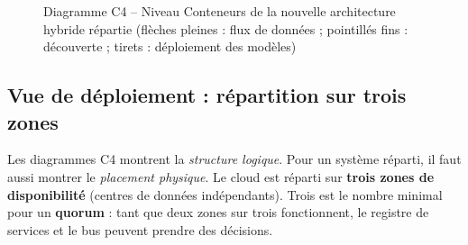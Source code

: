 \documentclass[11pt,a4paper]{article}
\begin{document}
\begin{landscape}
\begin{figure}[p]
{
}
\caption{Diagramme C4 -- Niveau Conteneurs de la nouvelle architecture hybride répartie (flèches pleines : flux de données ; pointillés fins : découverte ; tirets : déploiement des modèles)}
\end{figure}
\end{landscape}

\subsection{Vue de déploiement : répartition sur trois zones}

Les diagrammes C4 montrent la \emph{structure logique}. Pour un système réparti, il faut aussi montrer le \emph{placement physique}. Le cloud est réparti sur \textbf{trois zones de disponibilité} (centres de données indépendants). Trois est le nombre minimal pour un \textbf{quorum} : tant que deux zones sur trois fonctionnent, le registre de services et le bus peuvent prendre des décisions.
\end{document}
